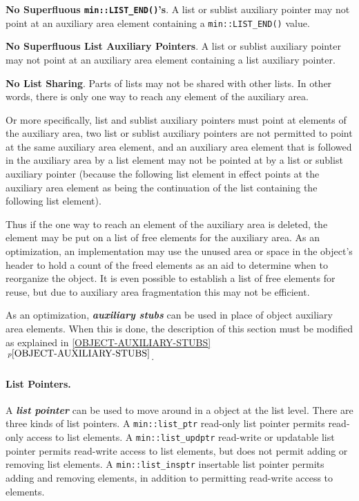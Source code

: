 \documentclass[12pt]{article}
\newcommand{\subsubsubsection}[1]{\paragraph[#1]{#1.}}
\newcommand{\key}[1]{{\bf \em #1}\index{#1}}
\newcommand{\skey}[2]{{\bf \em #1#2}\index{#1}}
\newcommand{\itemref}[1]{\ref{#1}$\,^{p\pageref{#1}}$}
\newcommand{\EOL}{\penalty \exhyphenpenalty}
\newenvironment{indpar}[1][0.3in]%
	{\begin{list}{}%
		     {\setlength{\itemsep}{0in}%
		      \setlength{\topsep}{0in}%
		      \setlength{\parsep}{1ex}%
		      \setlength{\labelwidth}{#1}%
		      \setlength{\leftmargin}{#1}%
		      \addtolength{\leftmargin}{\labelsep}}%
	 \item}%
	{\end{list}}
\begin{document}
\begin{indpar}
{\bf No Superfluous {\tt \bf min::LIST\_END()}'s}.%
%
\label{NO-SUPERFLUOUS-LIST}
A list or sublist auxiliary pointer may not point at an auxiliary
area element containing a \verb|min::LIST_END()| value.

{\bf No Superfluous List Auxiliary Pointers}.%
A list or sublist auxiliary pointer may not point at an auxiliary
area element containing a list auxiliary pointer.

{\bf No List Sharing}.%
Parts of lists may not be shared with other lists.  In other words,
there is only one way to reach any element of the auxiliary area.

Or more specifically, list and sublist
auxiliary pointers must point at elements of the auxiliary area,
two list or sublist auxiliary pointers are not permitted to point
at the same auxiliary
area element, and an auxiliary area element that is followed
in the auxiliary area by a list element may not be pointed at by
a list or sublist auxiliary pointer (because the following list element
in effect points at the auxiliary area element as being the
continuation of the list containing the following list element).
\end{indpar}

Thus if the one way to reach an element of
the auxiliary area is deleted, the element may be put on a list of
free elements for the auxiliary area.  As an optimization,
an implementation may use the unused area or space in the object's header
to hold a count of the freed elements as an aid to determine when to
reorganize the object.  It is even possible to establish a list of
free elements for reuse, but due to auxiliary area fragmentation this
may not be efficient.

As an optimization, \skey{auxiliary stub}s can be used in place of object
auxiliary area elements.  When this is done, the description of this
section must be modified as explained in \itemref{OBJECT-AUXILIARY-STUBS}.

\subsubsubsection{List Pointers}
\label{LIST-POINTERS}

A \key{list pointer} can be used to move around in a object at
the list level.
There are three kinds of list pointers.
A \verb|min::list_ptr| read-only list pointer permits read-only access to list
elements.
A {\tt min::\EOL list\_\EOL updptr} read-write or updatable list pointer
permits read-write access to list elements, but does not permit
adding or removing list elements.
A {\tt min::\EOL list\_\EOL insptr} insertable list pointer
permits adding and removing elements, in addition to permitting
read-write access to elements.
\end{document}
